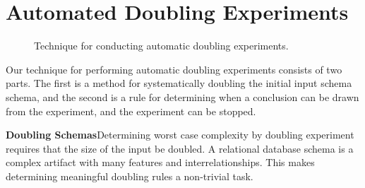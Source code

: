 
\section{Automated Doubling Experiments}\label{sec:technique}

  \begin{figure*}
    
    \caption{Technique for conducting automatic doubling experiments.}
    \label{fig:doublingexp}
  \end{figure*}

  Our technique for performing automatic doubling experiments consists of two parts.
  The first is a method for systematically doubling the initial input schema schema,
  and the second is a rule for determining when a conclusion can be
  drawn from the experiment, and the experiment can be stopped.

  \textbf{Doubling Schemas}Determining worst case complexity by doubling
  experiment requires that the size of the input be doubled. A relational database
  schema is a complex artifact with many features and interrelationships.
  This makes determining meaningful doubling rules a non-trivial task.


